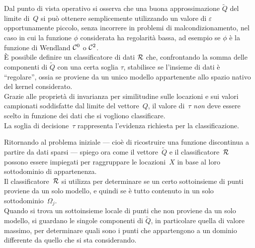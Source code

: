 \rf Dal punto di vista operativo si osserva che una buona approssimazione $\tilde Q$ del limite di~$Q$ si può ottenere semplicemente utilizzando un valore di $\varepsilon$ opportunamente piccolo, senza incorrere in problemi di malcondizionamento, nel caso in cui la funzione $\phi$ considerata ha regolarità bassa, ad esempio se $\phi$ è la funzione di Wendland ${\cal C}^0$ o ${\cal C}^2$.\\
È possibile definire un classificatore di dati $\cal R$ che, confrontando la somma delle componenti di $\tilde Q$ con una certa soglia $\tau$, stabilisce se l’insieme di dati è “regolare”, ossia se proviene da un unico modello appartenente allo spazio nativo del kernel considerato.\\ 
Grazie alle proprietà di invarianza per similitudine sulle locazioni e sui valori campionati soddisfatte dal limite del vettore~$Q$, il valore di~$\tau$ {\em non} deve essere scelto in funzione dei dati che si vogliono classificare.\\
 La soglia di decisione~$\tau$ rappresenta l’evidenza richiesta per la classificazione.




\rf Ritornando al problema iniziale --- cioè di ricostruire una funzione discontinua a partire da dati sparsi --- spiego ora come il vettore~$\tilde Q$ e il classificatore~$\cal R$  possono essere impiegati per raggruppare le locazioni~$X$ in base al loro sottodominio di appartenenza.\\
Il classificatore~$\cal R$ si utilizza per determinare se un certo sottoinsieme di punti proviene da un solo modello, e quindi se è tutto contenuto in un solo sottodominio~$\Omega_j$.\\
Quando si trova un sottoinsieme locale di punti che non proviene da un solo modello, si guardano le singole componenti di $\tilde Q$, in particolare quella di valore massimo, per determinare quali sono i punti che appartengono a un dominio differente da quello che si sta considerando.



